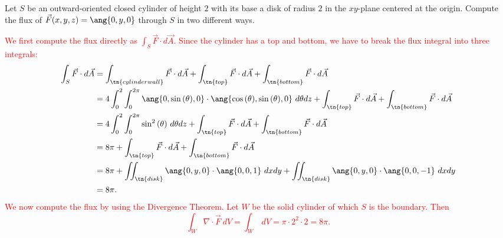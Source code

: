 \documentclass[12pt,reqno]{amsart}
\begin{document}
\prob Let $S$ be an outward-oriented closed cylinder of height $2$ with its base a disk of radius $2$ in the $xy$-plane centered at the origin. Compute the flux of $\vec{F}(x,y,z) = \ang{0,y,0}$ through $S$ in two different ways.

\bigskip
\textcolor{red}{
We first compute the flux directly as $\int_S \vec{F}\cdot d\vec{A}$. Since the cylinder has a top and bottom, we have to break the flux integral into three integrals:
\begin{align*}
\int_S \vec{F} \cdot d\vec{A} &= \int_\tn{cylinder wall} \vec{F} \cdot d\vec{A} + \int_\tn{top} \vec{F} \cdot d\vec{A} + \int_\tn{bottom} \vec{F} \cdot d\vec{A} \\
&= 4 \int_0^2 \int_0^{2\pi} \ang{0,\sin{(\theta)},0} \cdot \ang{\cos{(\theta)},\sin{(\theta)},0} \ d\theta dz + \int_\tn{top} \vec{F} \cdot d\vec{A} + \int_\tn{bottom} \vec{F} \cdot d\vec{A} \\
&= 4 \int_0^2 \int_0^{2\pi} \sin^2{(\theta)} \ d\theta dz + \int_\tn{top} \vec{F} \cdot d\vec{A} + \int_\tn{bottom} \vec{F} \cdot d\vec{A} \\
&= 8\pi + \int_\tn{top} \vec{F} \cdot d\vec{A} + \int_\tn{bottom} \vec{F} \cdot d\vec{A} \\
&= 8\pi + \iint_\tn{disk} \ang{0,y,0} \cdot \ang{0,0,1}\ dxdy + \iint_\tn{disk} \ang{0,y,0} \cdot \ang{0,0,-1} \ dxdy \\
&= 8\pi.
\end{align*}
We now compute the flux by using the Divergence Theorem. Let $W$ be the solid cylinder of which $S$ is the boundary. Then
	\[\int_W \nabla\cdot \vec{F} \ dV = \int_W \ dV = \pi\cdot 2^2 \cdot 2 = 8\pi.
	\]}
\end{document}

